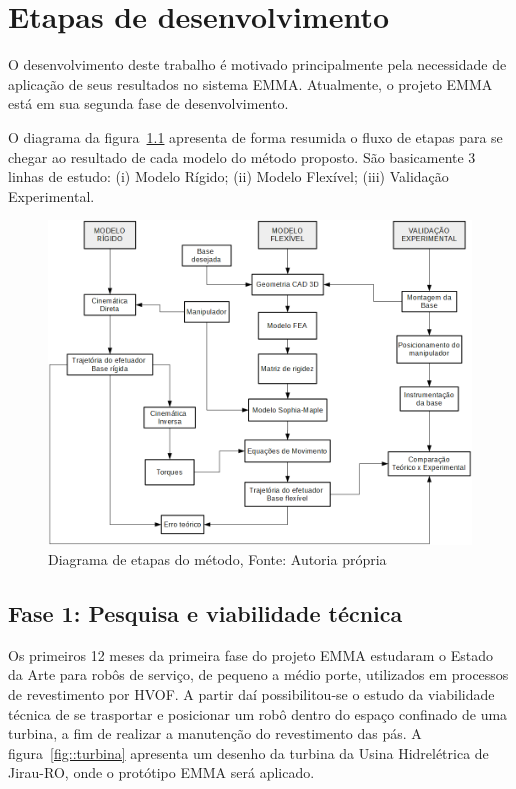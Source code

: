 \chapter{Etapas de desenvolvimento}

O desenvolvimento deste trabalho é motivado principalmente pela necessidade
de aplicação de seus resultados no sistema EMMA. Atualmente, o projeto EMMA está
em sua segunda fase de desenvolvimento.

O diagrama da figura~\ref{fig::diagrama} apresenta de forma resumida o fluxo de
etapas para se chegar ao resultado de cada modelo do método proposto.
São basicamente 3 linhas de estudo: (i) Modelo Rígido; (ii) Modelo Flexível;
(iii) Validação Experimental.

\begin{figure}[h!]
\centering
\includegraphics[width=15cm]{figs/diagrama.PNG}
\caption{Diagrama de etapas do método, Fonte: Autoria própria}
\label{fig::diagrama}
\end{figure}

\section{Fase 1: Pesquisa e viabilidade técnica}

Os primeiros 12 meses da primeira fase do projeto EMMA estudaram o Estado da
Arte para robôs de serviço, de pequeno a médio porte, utilizados em processos de
revestimento por HVOF.
A partir daí possibilitou-se o estudo da viabilidade técnica de se trasportar e
posicionar um robô dentro do espaço confinado de uma turbina, a fim de realizar
a manutenção do revestimento das pás. A figura~\ref{fig::turbina}
apresenta um desenho da turbina da Usina Hidrelétrica de Jirau-RO, onde o
protótipo EMMA será aplicado.


